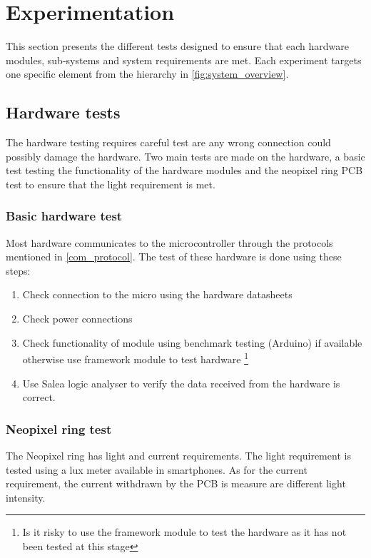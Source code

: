 \section{Experimentation}
This section presents the different tests designed to ensure that each hardware modules, sub-systems and system requirements are met. Each experiment targets one specific element from the hierarchy in \cref{fig:system_overview}.
\subsection{Hardware tests}
The hardware testing requires careful test are any wrong connection could possibly damage the hardware. Two main tests are made on the hardware, a basic test testing the functionality of the hardware modules and the neopixel ring PCB test to ensure that the light requirement is met.
\subsubsection{Basic hardware test}
Most hardware communicates to the microcontroller through the protocols mentioned in \cref{com_protocol}. The test of these hardware is done using these steps:
\begin{enumerate}
\item Check connection to the micro using the hardware datasheets
\item Check power connections
\item Check functionality of module using benchmark testing (Arduino) if available otherwise use framework module to test hardware \footnote{Is it risky to use the framework module to test the hardware as it has not been tested at this stage}
\item Use Salea logic analyser to verify the data received from the hardware is correct.
\end{enumerate} 
\subsubsection{Neopixel ring test}
The Neopixel ring has light and current requirements. The light requirement is tested using a lux meter available in smartphones. As for the current requirement, the current withdrawn by the PCB is measure are different light intensity. 

